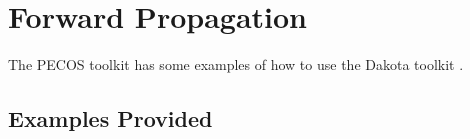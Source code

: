 \chapter{Forward Propagation}\label{ch-fp}
\thispagestyle{headings}

The PECOS toolkit has some examples of how to use the Dakota toolkit \cite{dakota}.

\section{Examples Provided}\label{sc-fp-examples}

